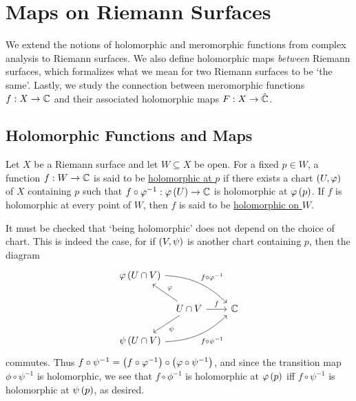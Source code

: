 \documentclass[../Moduli_Spaces_of_Riemann_Surfaces.tex]{subfiles}
\begin{document}
    \section{Maps on Riemann Surfaces}\label{RS:sec:maps_on_Riemann_surfaces}
    We extend the notions of holomorphic and meromorphic functions from complex analysis to Riemann surfaces. We also define holomorphic maps \textit{between} Riemann surfaces, which formalizes what we mean for two Riemann surfaces to be `the same'. Lastly, we study the connection between meromorphic functions $f:X\to\mathbb{C}$ and their associated holomorphic maps $F:X\to\hat{\mathbb{C}}$.
    \subsection{Holomorphic Functions and Maps}
    \begin{definition}
        Let $X$ be a Riemann surface and let $W\subseteq X$ be open. For a fixed $p\in W$, a function $f:W\to\mathbb{C}$ is said to be \ul{holomorphic at $p$} if there exists a chart $\left(U,\varphi\right)$ of $X$ containing $p$ such that $f\circ\varphi^{-1}:\varphi\left(U\right)\to\mathbb{C}$ is holomorphic at $\varphi\left(p\right)$. If $f$ is holomorphic at every point of $W$, then $f$ is said to be \ul{holomorphic on $W$}.
    \end{definition}
    \begin{remark}
        It must be checked that $\textrm{`}$being holomorphic$\textrm{'}$ does not depend on the choice of chart. This is indeed the case, for if $\left(V,\psi\right)$ is another chart containing $p$, then the diagram
        \begin{equation}\label{RS:eqn:holomorphic_function_well_defined}
            \begin{tikzcd}[column sep = 0.1in]
                \phi\l(U\cap V\r) \ar[drrrr, "f\circ\phi^{-1}", bend left = 20] \\
                & U\cap V \ar[ul, "\phi"'] \ar[dl, "\psi"] \ar[rrr, "f"] & & & \C \\
                \psi\l(U\cap V\r) \ar [urrrr, "f\circ\psi^{-1}"', bend right = 20]
            \end{tikzcd}
        \end{equation}
        commutes. Thus $f\circ\psi^{-1}=\left(f\circ\varphi^{-1}\right)\circ\left(\varphi\circ\psi^{-1}\right)$, and since the transition map $\phi\circ\psi^{-1}$ is holomorphic, we see that $f\circ\phi^{-1}$ is holomorphic at $\varphi\left(p\right)$ iff $f\circ\psi^{-1}$ is holomorphic at $\psi\left(p\right)$, as desired.\exqed
    \end{remark}
\end{document}

